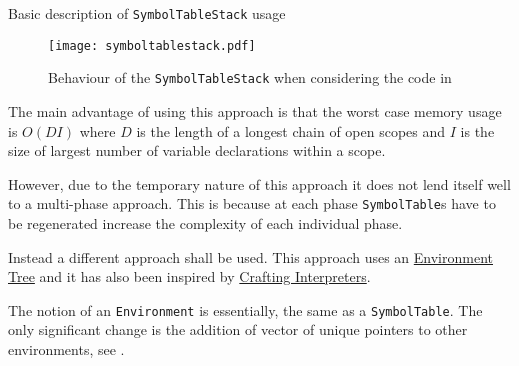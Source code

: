 \begin{algorithm}[H]


\caption{Basic description of \texttt{SymbolTableStack} usage}
\label{alg:basicsymboltablestack}
\end{algorithm}

\begin{figure}[H]
\centering
\begin{mdframed}[backgroundcolor=UMPaleRed]
\texttt{[image: symboltablestack.pdf]}
\end{mdframed}
\caption{Behaviour of the \texttt{SymbolTableStack} when
considering the code in }
\label{fig:graphicaldecpiction}
\end{figure}

\label{sss:memoryadvantage}The main advantage of using this
approach is that the worst case memory usage is $O(DI)$ where
$D$ is the length of a longest chain of open scopes and $I$ is
the size of largest number of variable declarations within a
scope.

However, due to the temporary nature of this approach it does
not lend itself well to a multi-phase approach. This is because
at each phase \texttt{SymbolTable}s have to be regenerated
increase the complexity of each individual phase.

Instead a different approach shall be used. This approach uses
an
\href{https://craftinginterpreters.com/statements-and-state.html#nesting-and-shadowing}{Environment
Tree} and it has also been inspired by
\href{https://craftinginterpreters.com/}{Crafting Interpreters}.

The notion of an \texttt{Environment} is essentially, the same
as a \texttt{SymbolTable}. The only significant change is the
addition of vector of unique pointers to other environments, see
.

